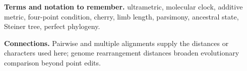 \documentclass[11pt]{article}
\begin{document}
{\footnotesize
\textbf{Terms and notation to remember.} ultrametric, molecular clock, additive metric, four-point condition, cherry, limb length, parsimony, ancestral state, Steiner tree, perfect phylogeny.

\textbf{Connections.} Pairwise and multiple alignments supply the distances or characters used here; genome rearrangement distances broaden evolutionary comparison beyond point edits.
}
\end{document}
